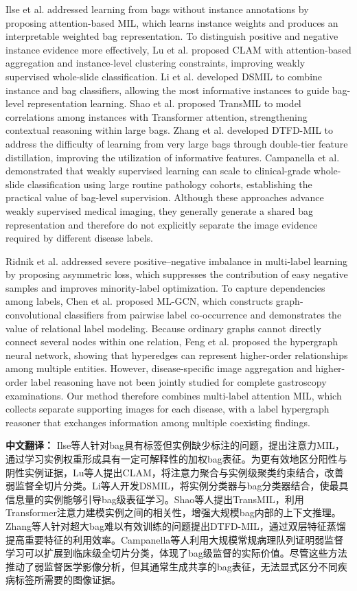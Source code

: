 \documentclass[Afour,sagev,times]{sagej}
\begin{document}
Ilse et al. addressed learning from bags without instance annotations by proposing attention-based MIL, which learns instance weights and produces an interpretable weighted bag representation.\cite{R10} To distinguish positive and negative instance evidence more effectively, Lu et al. proposed CLAM with attention-based aggregation and instance-level clustering constraints, improving weakly supervised whole-slide classification.\cite{R11} Li et al. developed DSMIL to combine instance and bag classifiers, allowing the most informative instances to guide bag-level representation learning.\cite{R12} Shao et al. proposed TransMIL to model correlations among instances with Transformer attention, strengthening contextual reasoning within large bags.\cite{R13} Zhang et al. developed DTFD-MIL to address the difficulty of learning from very large bags through double-tier feature distillation, improving the utilization of informative features.\cite{R14} Campanella et al. demonstrated that weakly supervised learning can scale to clinical-grade whole-slide classification using large routine pathology cohorts, establishing the practical value of bag-level supervision.\cite{R15} Although these approaches advance weakly supervised medical imaging, they generally generate a shared bag representation and therefore do not explicitly separate the image evidence required by different disease labels.

Ridnik et al. addressed severe positive--negative imbalance in multi-label learning by proposing asymmetric loss, which suppresses the contribution of easy negative samples and improves minority-label optimization.\cite{R16} To capture dependencies among labels, Chen et al. proposed ML-GCN, which constructs graph-convolutional classifiers from pairwise label co-occurrence and demonstrates the value of relational label modeling.\cite{R17} Because ordinary graphs cannot directly connect several nodes within one relation, Feng et al. proposed the hypergraph neural network, showing that hyperedges can represent higher-order relationships among multiple entities.\cite{R18} However, disease-specific image aggregation and higher-order label reasoning have not been jointly studied for complete gastroscopy examinations. Our method therefore combines multi-label attention MIL, which collects separate supporting images for each disease, with a label hypergraph reasoner that exchanges information among multiple coexisting findings.

\noindent\textbf{中文翻译：}
Ilse等人针对bag具有标签但实例缺少标注的问题，提出注意力MIL，通过学习实例权重形成具有一定可解释性的加权bag表征。为更有效地区分阳性与阴性实例证据，Lu等人提出CLAM，将注意力聚合与实例级聚类约束结合，改善弱监督全切片分类。Li等人开发DSMIL，将实例分类器与bag分类器结合，使最具信息量的实例能够引导bag级表征学习。Shao等人提出TransMIL，利用Transformer注意力建模实例之间的相关性，增强大规模bag内部的上下文推理。Zhang等人针对超大bag难以有效训练的问题提出DTFD-MIL，通过双层特征蒸馏提高重要特征的利用效率。Campanella等人利用大规模常规病理队列证明弱监督学习可以扩展到临床级全切片分类，体现了bag级监督的实际价值。尽管这些方法推动了弱监督医学影像分析，但其通常生成共享的bag表征，无法显式区分不同疾病标签所需要的图像证据。
\end{document}

